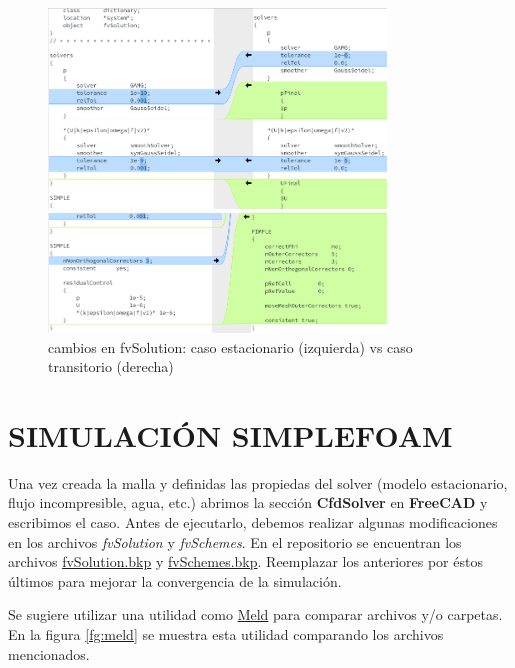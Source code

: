\documentclass[oneside,a4paper,spanish,links]{amca}
\begin{document}
\begin{figure}[htb]
	\centerline{\includegraphics[width=0.8\textwidth]{Figuras/02_fvSolution_1.png}} 
	\centerline{\includegraphics[width=0.8\textwidth]{Figuras/02_fvSolution_2.png}}
	\caption{cambios en fvSolution: caso estacionario (izquierda) vs caso transitorio (derecha)} \label{fg:fvSolution}
\end{figure}


\newpage
\newpage

\section{SIMULACIÓN SIMPLEFOAM}
Una vez creada la malla y definidas las propiedas del solver (modelo estacionario, flujo incompresible, agua, etc.) abrimos la sección \textbf{CfdSolver} en \textbf{FreeCAD} y escribimos el caso. Antes de ejecutarlo, debemos realizar algunas modificaciones en los archivos \textit{fvSolution} y \textit{fvSchemes}. En el repositorio se encuentran los archivos \href{https://github.com/guillerolle/casos_cfd/tree/master/03/case/system/fvSolution.bkp}{fvSolution.bkp} y \href{https://github.com/guillerolle/casos_cfd/tree/master/03/case/system/fvSchemes.bkp}{fvSchemes.bkp}. Reemplazar los anteriores por éstos últimos para mejorar la convergencia de la simulación.

Se sugiere utilizar una utilidad como \href{https://meldmerge.org}{Meld} para comparar archivos y/o carpetas. En la figura \ref{fg:meld} se muestra esta utilidad comparando los archivos mencionados.
\end{document}
